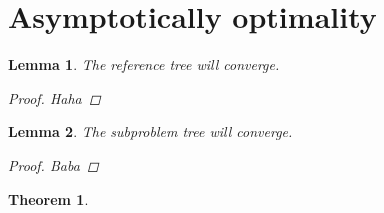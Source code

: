 \documentclass[paper=a4, fontsize=11pt]{scrartcl}
\newtheorem{thm}{Theorem}
\newtheorem{lem}{Lemma}
\begin{document}
\section{Asymptotically optimality}

\begin{lem}
\label{lem:ref_tree:conv}
The reference tree will converge.
\begin{proof}
Haha
\end{proof}
\end{lem}

\begin{lem}
\label{lem:sub_tree:conv}
The subproblem tree will converge.
\begin{proof}
Baba
\end{proof}
\end{lem}

\begin{thm}
\label{thm:morrt:asym_opt}
\end{thm}




\end{document}
